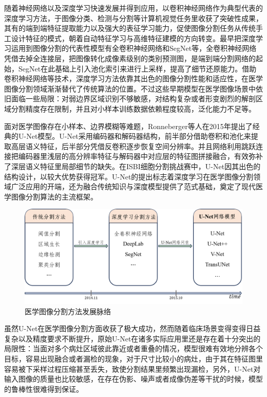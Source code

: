 随着神经网络以及深度学习快速发展并得到应用，以卷积神经网络作为典型代表的深度学习方法，于图像分类、检测与分割等计算机视觉任务里收获了突破性成果，其有的端到端特征提取能力以及强大的表征学习能力，促使图像分割任务从传统手工设计特征的模式，朝着自动特征学习与高维特征建模的方向转变。最早把深度学习运用到图像分割的代表性模型有全卷积神经网络和SegNet等\cite{shelhamer2016,badrinarayanan2016}，全卷积神经网络凭借去掉全连接层，把图像转化成像素级别的类别预测图，是端到端分割网络的起始，SegNet在此基础上引入池化索引来进行上采样，提高了细节还原能力。借助卷积神经网络等技术，深度学习方法依靠其出色的图像分割性能和适应性，在医学图像分割领域渐渐替代了传统算法的位置。不过这些早期模型在医学图像场景中依旧面临一些局限：对弱边界区域识别不够敏感，对结构复杂或者形变剧烈的解剖区域分割精度存在限制，并且对小样本训练数据依赖程度较高，泛化能力不足等。

面对医学图像存在小样本、边界模糊等难题，Ronneberger等人\cite{ronneberger2015}在2015年提出了经典的U-Net模型。U-Net采用编码器和解码器结构，前半部分借助卷积和池化来提取高层语义特征，后半部分凭借反卷积逐步恢复空间分辨率。并且网络利用跳跃连接把编码器里浅层的高分辨率特征与解码器中对应层的特征图拼接融合，有效弥补了深层语义特征里局部细节的缺失。在ISBI细胞分割挑战赛中，U-Net因其出色的结构设计，以较大优势获得冠军。U-Net的提出标志着深度学习在医学图像分割领域广泛应用的开端，还为融合传统知识与深度模型提供了范式基础，奠定了现代医学图像分割算法的主流框架。

\begin{figure}[h]
    \centering
    \includegraphics[width=\textwidth]{fig/develepment_of_seg.png}
    \caption{医学图像分割方法发展脉络}
    \label{develop_seg}
\end{figure}

虽然U-Net在医学图像分割方面收获了极大成功，然而随着临床场景变得变得日益复杂以及精度要求不断提升，原始U-Net在诸多实际应用里还是存在着十分突出的局限性：当面对多个病灶区域彼此靠近或者重叠的情况，模型很难有效地分辨各个目标，容易出现融合或者漏检的现象，对于尺寸比较小的病灶，由于其在特征图里容易被下采样过程压缩甚至丢失，致使分割结果里频繁出现漏检，另外，U-Net对输入图像的质量也比较敏感，在存在伪影、噪声或者成像伪差等干扰的时候，模型的鲁棒性很难得到保证\cite{azad2024}。

